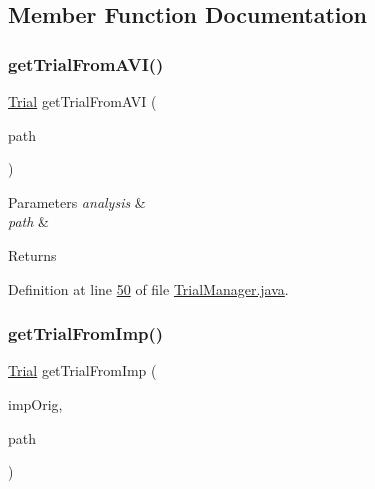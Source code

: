 \subsection{Member Function Documentation}
\hypertarget{classfunctions_1_1_trial_manager_a5d815ce30de28983d08c22c909562e11}{}\label{classfunctions_1_1_trial_manager_a5d815ce30de28983d08c22c909562e11} 
\subsubsection{\texorpdfstring{get\+Trial\+From\+A\+V\+I()}{getTrialFromAVI()}}
{\footnotesize\ttfamily \hyperlink{classdata_1_1_trial}{Trial} get\+Trial\+From\+A\+VI (\begin{DoxyParamCaption}\item[{String}]{path }\end{DoxyParamCaption})}


\begin{DoxyParams}{Parameters}
{\em analysis} & \\
\hline
{\em path} & \\
\hline
\end{DoxyParams}
\begin{DoxyReturn}{Returns}

\end{DoxyReturn}


Definition at line \hyperlink{_trial_manager_8java_source_l00050}{50} of file \hyperlink{_trial_manager_8java_source}{Trial\+Manager.\+java}.

\hypertarget{classfunctions_1_1_trial_manager_a2cc435133a7ef2cd5995f4fdde622611}{}\label{classfunctions_1_1_trial_manager_a2cc435133a7ef2cd5995f4fdde622611} 
\subsubsection{\texorpdfstring{get\+Trial\+From\+Imp()}{getTrialFromImp()}}
{\footnotesize\ttfamily \hyperlink{classdata_1_1_trial}{Trial} get\+Trial\+From\+Imp (\begin{DoxyParamCaption}\item[{Image\+Plus}]{imp\+Orig,  }\item[{String}]{path }\end{DoxyParamCaption})}


